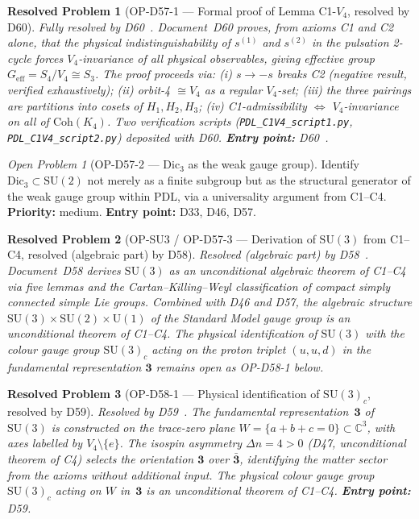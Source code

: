 \documentclass[11pt,a4paper]{article}
\newtheorem{resolvedproblem}{Resolved Problem}
\theoremstyle{plain}
\theoremstyle{definition}
\theoremstyle{remark}
\newtheorem{openproblem}[theorem]{Open Problem}
\begin{document}
\begin{resolvedproblem}[OP-D57-1 --- Formal proof of Lemma C1-$V_4$, resolved by D60]
\label{op:C1V4}
\textcolor{proofblue}{Fully resolved by D60~\cite{D60}.} Document~D60 proves, from axioms C1 and C2 alone, that the physical indistinguishability of $s^{(1)}$ and $s^{(2)}$ in the pulsation 2-cycle forces $V_4$-invariance of all physical observables, giving effective group $G_{\mathrm{eff}} = S_4/V_4 \cong S_3$. The proof proceeds via: (i) $s \to -s$ breaks C2 (negative result, verified exhaustively); (ii) orbit-4 $\cong V_4$ as a regular $V_4$-set; (iii) the three pairings are partitions into cosets of $H_1, H_2, H_3$; (iv) C1-admissibility $\Leftrightarrow$ $V_4$-invariance on all of $\mathrm{Coh}(K_4)$. Two verification scripts (\texttt{PDL\_C1V4\_script1.py}, \texttt{PDL\_C1V4\_script2.py}) deposited with D60. \textbf{Entry point:} D60~\cite{D60}.
\end{resolvedproblem}

\begin{openproblem}[OP-D57-2 --- $\mathrm{Dic}_3$ as the weak gauge group]
\label{op:Dic3}
Identify $\mathrm{Dic}_3 \subset \mathrm{SU}(2)$ not merely as a finite subgroup but as the structural generator of the weak gauge group within PDL, via a universality argument from C1--C4. \textbf{Priority:} medium. \textbf{Entry point:} D33, D46, D57.
\end{openproblem}

\begin{resolvedproblem}[OP-SU3 / OP-D57-3 --- Derivation of $\mathrm{SU}(3)$ from C1--C4, resolved (algebraic part) by D58]
\label{op:SU3}
\textcolor{proofblue}{Resolved (algebraic part) by D58~\cite{D58}.} Document~D58 derives $\mathrm{SU}(3)$ as an unconditional algebraic theorem of C1--C4 via five lemmas and the Cartan--Killing--Weyl classification of compact simply connected simple Lie groups. Combined with D46 and D57, the algebraic structure $\mathrm{SU}(3)\times\mathrm{SU}(2)\times\mathrm{U}(1)$ of the Standard Model gauge group is an unconditional theorem of C1--C4. The physical identification of $\mathrm{SU}(3)$ with the colour gauge group $\mathrm{SU}(3)_c$ acting on the proton triplet $(u,u,d)$ in the fundamental representation $\mathbf{3}$ remains open as OP-D58-1 below.
\end{resolvedproblem}

\begin{resolvedproblem}[OP-D58-1 --- Physical identification of $\mathrm{SU}(3)_c$, resolved by D59]
\label{op:D58one}
\textcolor{proofblue}{Resolved by D59~\cite{D59}.} The fundamental representation~$\mathbf{3}$ of $\mathrm{SU}(3)$ is constructed on the trace-zero plane $W = \{a+b+c=0\}\subset\mathbb{C}^3$, with axes labelled by $V_4\setminus\{e\}$. The isospin asymmetry $\Delta n = 4 > 0$ (D47, unconditional theorem of C4) selects the orientation $\mathbf{3}$ over $\bar{\mathbf{3}}$, identifying the matter sector from the axioms without additional input. The physical colour gauge group $\mathrm{SU}(3)_c$ acting on $W$ in~$\mathbf{3}$ is an unconditional theorem of C1--C4. \textbf{Entry point:} D59.
\end{resolvedproblem}
\end{document}
